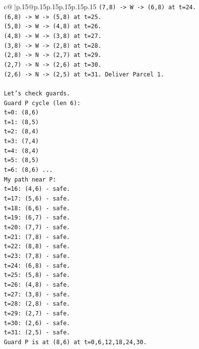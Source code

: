 \documentclass{article}
\begin{document}
{\begin{supertabular}{c@{$\;$}|p{.15\linewidth}@{}p{.15\linewidth}p{.15\linewidth}p{.15\linewidth}p{.15\linewidth}p{.15\linewidth}}
{{{\texttt{(7,8) {-}> W {-}> (6,8) at t=24.} \\
\texttt{(6,8) {-}> W {-}> (5,8) at t=25.} \\
\texttt{(5,8) {-}> W {-}> (4,8) at t=26.} \\
\texttt{(4,8) {-}> W {-}> (3,8) at t=27.} \\
\texttt{(3,8) {-}> W {-}> (2,8) at t=28.} \\
\texttt{(2,8) {-}> N {-}> (2,7) at t=29.} \\
\texttt{(2,7) {-}> N {-}> (2,6) at t=30.} \\
\texttt{(2,6) {-}> N {-}> (2,5) at t=31. Deliver Parcel 1.} \\
\\ 
\texttt{Let's check guards.} \\
\texttt{Guard P cycle (len 6):} \\
\texttt{t=0: (8,6)} \\
\texttt{t=1: (8,5)} \\
\texttt{t=2: (8,4)} \\
\texttt{t=3: (7,4)} \\
\texttt{t=4: (8,4)} \\
\texttt{t=5: (8,5)} \\
\texttt{t=6: (8,6) ...} \\
\texttt{My path near P:} \\
\texttt{t=16: (4,6) {-} safe.} \\
\texttt{t=17: (5,6) {-} safe.} \\
\texttt{t=18: (6,6) {-} safe.} \\
\texttt{t=19: (6,7) {-} safe.} \\
\texttt{t=20: (7,7) {-} safe.} \\
\texttt{t=21: (7,8) {-} safe.} \\
\texttt{t=22: (8,8) {-} safe.} \\
\texttt{t=23: (7,8) {-} safe.} \\
\texttt{t=24: (6,8) {-} safe.} \\
\texttt{t=25: (5,8) {-} safe.} \\
\texttt{t=26: (4,8) {-} safe.} \\
\texttt{t=27: (3,8) {-} safe.} \\
\texttt{t=28: (2,8) {-} safe.} \\
\texttt{t=29: (2,7) {-} safe.} \\
\texttt{t=30: (2,6) {-} safe.} \\
\texttt{t=31: (2,5) {-} safe.} \\
\texttt{Guard P is at (8,6) at t=0,6,12,18,24,30.} \\
}}}
\end{supertabular}}
\end{document}
